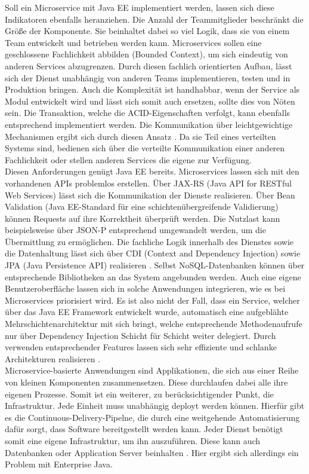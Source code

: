 Soll ein Microservice mit Java EE implementiert werden, lassen sich diese Indikatoren ebenfalls heranziehen. Die Anzahl der Teammitglieder beschränkt die Größe der Komponente. Sie beinhaltet dabei so viel Logik, dass sie von einem Team entwickelt und betrieben werden kann. Microservices sollen eine geschlossene Fachlichkeit abbilden (Bounded Context), um sich eindeutig von anderen Services abzugrenzen. Durch diesen fachlich orientierten Aufbau, lässt sich der Dienst unabhängig von anderen Teams implementieren, testen und in Produktion bringen. Auch die Komplexität ist handhabbar, wenn der Service als Modul entwickelt wird und lässt sich somit auch ersetzen, sollte dies von Nöten sein. Die Transaktion, welche die ACID-Eigenschaften verfolgt, kann ebenfalls entsprechend implementiert werden. Die Kommunikation über leichtgewichtige Mechanismen ergibt sich durch diesen Ansatz \cite{EberhardWolff.2015}. Da sie Teil eines verteilten Systems sind, bedienen sich über die verteilte Kommunikation einer anderen Fachlichkeit oder stellen anderen Services die eigene zur Verfügung. \\ 
Diesen Anforderungen genügt Java EE bereits. Microservices lassen sich mit den vorhandenen APIs problemlos erstellen. Über JAX-RS (Java API for RESTful Web Services) lässt sich die Kommunikation der Dienste realisieren. Über Bean Validation (Java EE-Standard für eine schichtenübergreifende Validierung) können Requests auf ihre Korrektheit überprüft werden. Die Nutzlast kann beispielsweise über JSON-P entsprechend umgewandelt werden, um die Übermittlung zu ermöglichen. Die fachliche Logik innerhalb des Dienstes sowie die Datenhaltung lässt sich über CDI (Context and Dependency Injection) sowie JPA (Java Persistence API) realisieren \cite{LarsRowekamp.2017d}. Selbst NoSQL-Datenbanken können über entsprechende Bibliotheken an das System angebunden werden. Auch eine eigene Benutzeroberfläche lassen sich in solche Anwendungen integrieren, wie es bei Microservices priorisiert wird. Es ist also nicht der Fall, dass ein Service, welcher über das Java EE Framework entwickelt wurde, automatisch eine aufgeblähte Mehrschichtenarchitektur mit sich bringt, welche entsprechende Methodenaufrufe nur über Dependency Injection Schicht für Schicht weiter delegiert. Durch verwenden entsprechender Features lassen sich sehr effiziente und schlanke Architekturen realisieren \cite{jaxcenter.2016}.\\
Microservice-basierte Anwendungen sind Applikationen, die sich aus einer Reihe von kleinen Komponenten zusammensetzen. Diese durchlaufen dabei alle ihre eigenen Prozesse. Somit ist ein weiterer, zu berücksichtigender Punkt, die Infrastruktur. Jede Einheit muss unabhängig deployt werden können. Hierfür gibt es die Continuous-Delivery-Pipelne, die durch eine weitgehende Automatisierung dafür sorgt, dass Software bereitgestellt werden kann. Jeder Dienst benötigt somit eine eigene Infrastruktur, um ihn auszuführen. Diese kann auch Datenbanken oder Application Server beinhalten \cite{EberhardWolff.2015}. Hier ergibt sich allerdings ein Problem mit Enterprise Java.

